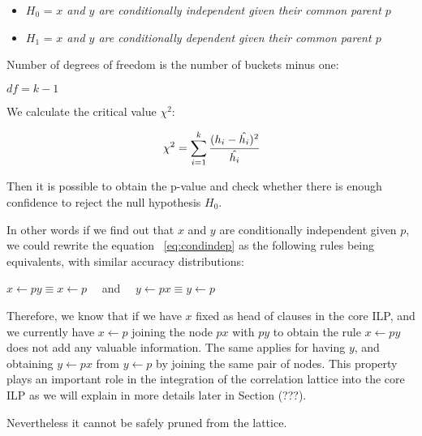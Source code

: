 \begin{itemize}
 \item $H_0$ = \emph{$x$ and $y$ are conditionally independent given their common parent $p$}
 \item $H_1$ = \emph{$x$ and $y$ are conditionally dependent given their common parent $p$} 
\end{itemize}

Number of degrees of freedom is the number of buckets minus one:

\begin{center}
 $df=k-1$
\end{center}

We calculate the critical value $\chi^2$:

\begin{equation}
 \chi^2=\sum_{i=1}^{k} \cfrac{(h_i - \hat{h_i})^2}{\hat{h_i}}
\end{equation}

\cite{Jaroszewicz02pruningredundant}

Then it is possible to obtain the p-value and check whether there is enough confidence to reject the null hypothesis
$H_0$. 


In other words if we find out that $x$ and $y$ are conditionally independent given $p$, we could rewrite the equation
~\ref{eq:condindep} as the following rules being equivalents, with similar accuracy distributions:

\begin{center}
  $x \leftarrow py \equiv x \leftarrow p \quad$ and  $\quad y \leftarrow px \equiv y \leftarrow p $
\end{center}

Therefore, we know that if we have $x$ fixed as head of clauses in the core ILP, and we currently have $x \leftarrow
p$
joining the node $px$ with $py$ to obtain the rule $x \leftarrow py$ does not add any valuable information. The same
applies
for having $y$, and obtaining $y \leftarrow px$ from $y \leftarrow p$ by joining the same pair of nodes. This property
plays an important role in the integration of the correlation lattice into the core ILP as we will explain in more
details later in Section (???).

Nevertheless it cannot be safely pruned from the lattice.  

